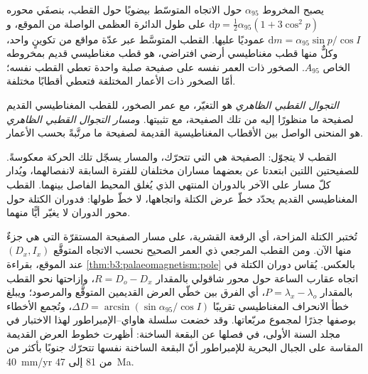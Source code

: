 يصبح المخروط $\alpha_{95}$ حول الاتجاه المتوسّط بيضويًا حول القطب،
بنصفَي محوره $\mathrm dp = \tfrac12\alpha_{95}(1 + 3\cos^2p)$ على طول الدائرة العظمى
الواصلة من الموقع، و$\mathrm dm = \alpha_{95}\sin p/\cos I$ عموديًا عليها.
القطب المتوسَّط عبر عدّة مواقع من تكوينٍ واحد، وكلٌّ منها قطب مغناطيسي أرضي افتراضي، هو قطب مغناطيسي قديم
بمخروطه الخاص $A_{95}$. الصخور ذات العمر نفسه على صفيحة صلبة واحدة تعطي
القطب نفسه؛ أمّا الصخور ذات الأعمار المختلفة فتعطي أقطابًا مختلفة.

\begin{definition}\label{def:b3:palaeomagnetism:apw}
\emph{التجوال القطبي الظاهري} هو التغيّر، مع
عمر الصخور، للقطب المغناطيسي القديم لصفيحة ما منظورًا إليه من تلك الصفيحة،
مع تثبيتها. و\emph{مسار التجوال القطبي الظاهري} هو المنحنى
الواصل بين الأقطاب المغناطيسية القديمة لصفيحة ما مرتَّبةً
بحسب الأعمار.
\end{definition}

القطب لا يتجوّل: الصفيحة هي التي تتحرّك، والمسار يسجّل تلك الحركة
معكوسةً. للصفيحتين اللتين ابتعدتا عن بعضهما مساران مختلفان للفترة
السابقة لانفصالهما، ويُدار كلّ مسار على الآخر بالدوران المنتهي
الذي يُغلق المحيط الفاصل بينهما. القطب المغناطيسي القديم يحدّد
خطّ عرض الكتلة واتجاهها، لا خطّ طولها: فدوران
الكتلة حول محور الدوران لا يغيّر أيًّا منهما.

تُختبر الكتلة المزاحة، أي الرقعة القشرية، على مسار الصفيحة المستقرّة التي
هي جزءٌ منها الآن. ومن القطب المرجعي ذي العمر الصحيح نحسب الاتجاه
المتوقَّع $(D_x, I_x)$ عند الموقع، بقراءة \cref{thm:b3:palaeomagnetism:pole}
بالعكس. يُقاس دوران الكتلة في اتجاه عقارب الساعة حول محور شاقولي
بالمقدار $R = D_o - D_x$، وإزاحتها نحو القطب بالمقدار $P = \lambda_x -
\lambda_o$، أي الفرق بين خطّي العرض القديمين المتوقَّع والمرصود؛
ويبلغ خطأ الانحراف المغناطيسي تقريبًا $\Delta D = \arcsin(\sin\alpha_{95}/\cos I)$،
وتُجمع الأخطاء بوصفها جذرًا لمجموع مربّعاتها. وقد خضعت سلسلة هاواي--الإمبراطور
لهذا الاختبار في مجلد السنة الأولى، في فصلها عن البقعة الساخنة:
أظهرت خطوط العرض القديمة المقاسة على الجبال البحرية للإمبراطور أنّ البقعة الساخنة نفسها
تتحرّك جنوبًا بأكثر من \qty{40}{mm/yr} من 81 إلى \qty{47}{Ma}.

